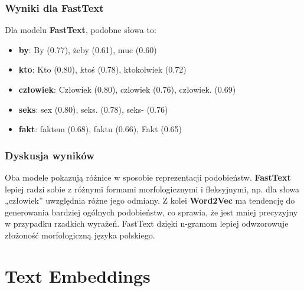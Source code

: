 \documentclass[12pt]{article}
\begin{document}
\subsubsection{Wyniki dla FastText}
Dla modelu \textbf{FastText}, podobne słowa to:
\begin{itemize}
    \item \textbf{by}: By (0.77), żeby (0.61), muc (0.60)
    \item \textbf{kto}: Kto (0.80), ktoś (0.78), ktokolwiek (0.72)
    \item \textbf{człowiek}: Człowiek (0.80), czlowiek (0.76), człowiek. (0.69)
    \item \textbf{seks}: sex (0.80), seks. (0.78), seks- (0.76)
    \item \textbf{fakt}: faktem (0.68), faktu (0.66), Fakt (0.65)
\end{itemize}

\subsubsection{Dyskusja wyników}
Oba modele pokazują różnice w sposobie reprezentacji podobieństw. \textbf{FastText} lepiej radzi sobie z różnymi formami morfologicznymi i fleksyjnymi, np. dla słowa „człowiek” uwzględnia różne jego odmiany. Z kolei \textbf{Word2Vec} ma tendencję do generowania bardziej ogólnych podobieństw, co sprawia, że jest mniej precyzyjny w przypadku rzadkich wyrażeń. FastText dzięki n-gramom lepiej odwzorowuje złożoność morfologiczną języka polskiego.

\section{Text Embeddings}
\end{document}
